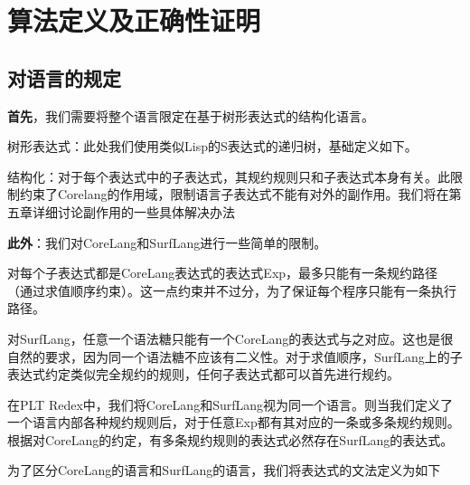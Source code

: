 \pagestyle{fancy}
\normalsize
\linespread{1.5}\selectfont
\chapter{算法定义及正确性证明}

\section{对语言的规定}
{\bfseries 首先}，我们需要将整个语言限定在基于树形表达式的结构化语言。

树形表达式：此处我们使用类似Lisp的S表达式的递归树，基础定义如下。


结构化：对于每个表达式中的子表达式，其规约规则只和子表达式本身有关。此限制约束了Corelang的作用域，限制语言子表达式不能有对外的副作用。我们将在第五章详细讨论副作用的一些具体解决办法

{\bfseries 此外}：我们对CoreLang和SurfLang进行一些简单的限制。

对每个子表达式都是CoreLang表达式的表达式Exp，最多只能有一条规约路径（通过求值顺序约束）。这一点约束并不过分，为了保证每个程序只能有一条执行路径。

对SurfLang，任意一个语法糖只能有一个CoreLang的表达式与之对应。这也是很自然的要求，因为同一个语法糖不应该有二义性。对于求值顺序，SurfLang上的子表达式约定类似完全规约的规则，任何子表达式都可以首先进行规约。

在PLT Redex中，我们将CoreLang和SurfLang视为同一个语言。则当我们定义了一个语言内部各种规约规则后，对于任意Exp都有其对应的一条或多条规约规则。根据对CoreLang的约定，有多条规约规则的表达式必然存在SurfLang的表达式。

为了区分CoreLang的语言和SurfLang的语言，我们将表达式的文法定义为如下

